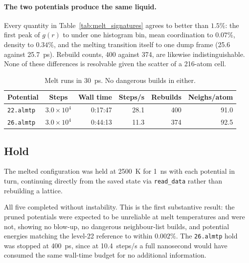 \documentclass{article}
\begin{document}
\paragraph{The two potentials produce the same liquid.}
Every quantity in Table~\ref{tab:melt_signatures} agrees to better than $1.5\%$: the first peak of $g(r)$ to under one histogram bin, mean coordination to $0.07\%$, density to $0.34\%$, and the melting transition itself to one dump frame (25.6 against 25.7~ps). Rebuild counts, 400 against 374, are likewise indistinguishable. None of these differences is resolvable given the scatter of a 216-atom cell.
\begin{table}[H]
    \centering
    \small
    \begin{tabular}{l|c|r|r|r|r}
        \toprule
        Potential & Steps & Wall time & Steps/s & Rebuilds & Neighs/atom \\
        \midrule
        \texttt{22.almtp} & $3.0\times10^4$ & 0:17:47 & 28.1 & 400 & 91.0 \\
        \texttt{26.almtp} & $3.0\times10^4$ & 0:44:13 & 11.3 & 374 & 92.5 \\
        \bottomrule
    \end{tabular}
    \caption{Melt runs in 30~ps. No dangerous builds in either.}
    \label{tab:melt_bench}
\end{table}

\subsection{Hold}
The melted configuration was held at 2500~K for 1~ns with each potential in turn, continuing directly from the saved state via \texttt{read\_data} rather than rebuilding a lattice.

All five completed without instability. This is the first substantive result: the pruned potentials were expected to be unreliable at melt temperatures and were not, showing no blow-up, no dangerous neighbour-list builds, and potential energies matching the level-22 reference to within $0.002\%$. The \texttt{26.almtp} hold was stopped at 400~ps, since at 10.4~steps/s a full nanosecond would have consumed the same wall-time budget for no additional information.
\end{document}
